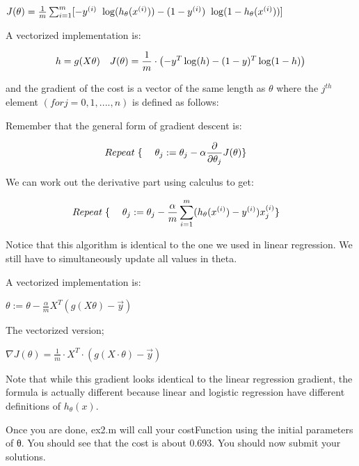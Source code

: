 \documentclass[
]{book}
\begin{document}
\(J(\theta) = \frac{1}{m} \sum_{i=1}^m \large[ -y^{(i)}\ \log (h_\theta (x^{(i)})) - (1 - y^{(i)})\ \log (1 - h_\theta(x^{(i)})) \large]\)

A vectorized implementation is:

{
\begin{align} & h = g(X\theta)\newline & J(\theta) = \frac{1}{m} \cdot \left(-y^{T}\log(h)-(1-y)^{T}\log(1-h)\right) \end{align}
}

and the gradient of the cost is a vector of the same length as \(\theta\) where the \(j^{th}\) element \((for j = 0, 1, ....,n)\) is defined as follows:

Remember that the general form of gradient descent is:

\begin{align}& Repeat \; \lbrace \newline & \; \theta_j := \theta_j - \alpha \dfrac{\partial}{\partial \theta_j}J(\theta) \newline & \rbrace\end{align}

We can work out the derivative part using calculus to get:

\begin{align} & Repeat \; \lbrace \newline & \; \theta_j := \theta_j - \frac{\alpha}{m} \sum_{i=1}^m (h_\theta(x^{(i)}) - y^{(i)}) x_j^{(i)} \newline & \rbrace \end{align}

Notice that this algorithm is identical to the one we used in linear regression. We still have to simultaneously update all values in theta.

A vectorized implementation is:

{
\(\theta := \theta - \frac{\alpha}{m} X^{T} (g(X \theta ) - \vec{y})\)
}

The vectorized version;

\(\nabla J(\theta) = \frac{1}{m} \cdot X^T \cdot \left(g\left(X\cdot\theta\right) - \vec{y}\right)\)

Note that while this gradient looks identical to the linear regression gradient, the formula is actually different because linear and logistic regression have different definitions of \(h_θ(x)\).

Once you are done, ex2.m will call your costFunction using the initial parameters of θ. You should see that the cost is about 0.693. You should now submit your solutions.
\end{document}
